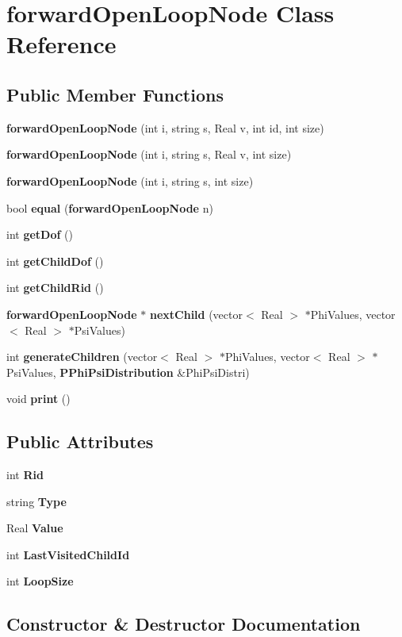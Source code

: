 \section{forward\-Open\-Loop\-Node Class Reference}
\label{classforwardOpenLoopNode}
\subsection*{Public Member Functions}
\begin{CompactItemize}
\item 
{\bf forward\-Open\-Loop\-Node} (int i, string s, Real v, int id, int size)
\item 
{\bf forward\-Open\-Loop\-Node} (int i, string s, Real v, int size)
\item 
{\bf forward\-Open\-Loop\-Node} (int i, string s, int size)
\item 
bool {\bf equal} ({\bf forward\-Open\-Loop\-Node} n)
\item 
int {\bf get\-Dof} ()
\item 
int {\bf get\-Child\-Dof} ()
\item 
int {\bf get\-Child\-Rid} ()
\item 
{\bf forward\-Open\-Loop\-Node} $\ast$ {\bf next\-Child} (vector$<$ Real $>$ $\ast$Phi\-Values, vector$<$ Real $>$ $\ast$Psi\-Values)
\item 
int {\bf generate\-Children} (vector$<$ Real $>$ $\ast$Phi\-Values, vector$<$ Real $>$ $\ast$Psi\-Values, {\bf PPhi\-Psi\-Distribution} \&Phi\-Psi\-Distri)
\item 
void {\bf print} ()
\end{CompactItemize}
\subsection*{Public Attributes}
\begin{CompactItemize}
\item 
int {\bf Rid}
\item 
string {\bf Type}
\item 
Real {\bf Value}
\item 
int {\bf Last\-Visited\-Child\-Id}
\item 
int {\bf Loop\-Size}
\end{CompactItemize}


\subsection{Constructor \& Destructor Documentation}
